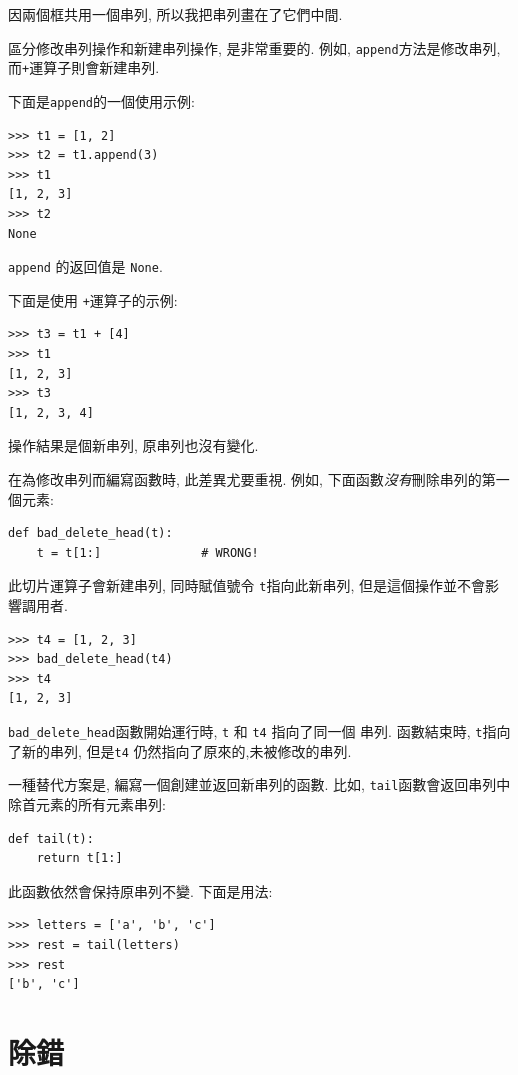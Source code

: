 \documentclass[10pt]{book}
\begin{document}
因兩個框共用一個串列, 所以我把串列畫在了它們中間. 

區分修改串列操作和新建串列操作, 是非常重要的. 
例如,  {\tt append}方法是修改串列, 而{\tt +}運算子則會新建串列.

下面是{\tt append}的一個使用示例:
%
\begin{verbatim}
>>> t1 = [1, 2]
>>> t2 = t1.append(3)
>>> t1
[1, 2, 3]
>>> t2
None
\end{verbatim}
%
{\tt append} 的返回值是 {\tt None}.

下面是使用 {\tt +}運算子的示例:
%
\begin{verbatim}
>>> t3 = t1 + [4]
>>> t1
[1, 2, 3]
>>> t3
[1, 2, 3, 4]
\end{verbatim}
%
操作結果是個新串列, 原串列也沒有變化.

在為修改串列而編寫函數時, 此差異尤要重視. 
例如, 下面函數{\em 沒有}刪除串列的第一個元素:
%
\begin{verbatim}
def bad_delete_head(t):
    t = t[1:]              # WRONG!
\end{verbatim}
%
此切片運算子會新建串列, 同時賦值號令 {\tt t}指向此新串列, 
但是這個操作並不會影響調用者.
%
\begin{verbatim}
>>> t4 = [1, 2, 3]
>>> bad_delete_head(t4)
>>> t4
[1, 2, 3]
\end{verbatim}
%

\verb"bad_delete_head"函數開始運行時, {\tt t} 和 {\tt t4} 指向了同一個
串列. 函數結束時, {\tt t}指向了新的串列, 
但是{\tt t4} 仍然指向了原來的,未被修改的串列.

一種替代方案是, 編寫一個創建並返回新串列的函數. 比如, 
{\tt tail}函數會返回串列中除首元素的所有元素串列:

\begin{verbatim}
def tail(t):
    return t[1:]
\end{verbatim}
%
此函數依然會保持原串列不變. 下面是用法:

\begin{verbatim}
>>> letters = ['a', 'b', 'c']
>>> rest = tail(letters)
>>> rest
['b', 'c']
\end{verbatim}



\section{除錯}
\end{document}
